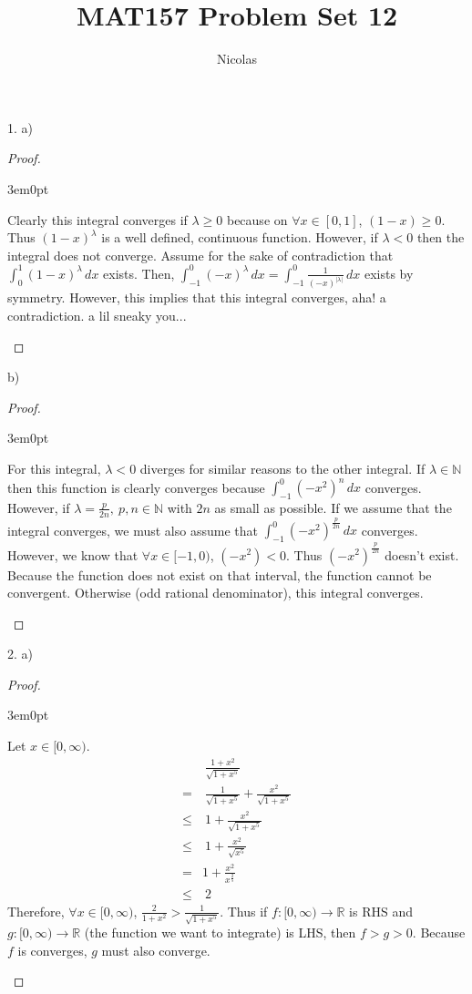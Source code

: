 \documentclass[11pt]{article}
\title{MAT157 Problem Set 12}
\author{Nicolas}
\newcommand{\R}{\mathbb{R}}
\newcommand{\N}{\mathbb{N}}
\newenvironment{myproof}
{\begin{proof} \begin{adjustwidth}{3em}{0pt}$ $\par\nobreak\ignorespaces}
{\end{adjustwidth} \end{proof}}
\begin{document}
\maketitle
\begin{flushleft}

1. a)

\begin{myproof}
Clearly this integral converges if $\lambda \geq 0$ because on $\forall x \in [0,1]$, $(1-x) \geq 0$. Thus $(1-x)^\lambda$ is a well defined, continuous function. However, if $\lambda < 0$ then the integral does not converge. Assume for the sake of contradiction that $\int_0^1 (1-x)^\lambda \,dx$ exists. Then, $\int_{-1}^0(-x)^\lambda \,dx = \int_{-1}^0\frac{1}{(-x)^{|\lambda|}} \,dx$ exists by symmetry. However, this implies that this integral converges, aha! a contradiction. a lil sneaky you...
\end{myproof}

b)

\begin{myproof}
For this integral, $\lambda < 0$ diverges for similar reasons to the other integral. If $\lambda \in \N$ then this function is clearly converges because $\int_{-1}^0(-x^2)^n \,dx$ converges. However, if $\lambda = \frac{p}{2n}, \ p,n \in \N$ with $2n$ as small as possible. If we assume that the integral converges, we must also assume that $\int_{-1}^0(-x^2)^{\frac{p}{2n}} \,dx$ converges. However, we know that $\forall x \in [-1,0)$, $(-x^2) < 0$. Thus $(-x^2)^{\frac{p}{2n}}$ doesn't exist. Because the function does not exist on that interval, the function cannot be convergent. Otherwise (odd rational denominator), this integral converges.
\end{myproof}

\newpage

2. a)

\begin{myproof}
Let $x \in [0, \infty)$.
\begin{align*}
& \ \frac{1+x^2}{\sqrt{1+x^5}} \\
 = & \ \frac{1}{\sqrt{1+x^5}} + \frac{x^2}{\sqrt{1+x^5}} \\
 \leq & \ 1 + \frac{x^2}{\sqrt{1+x^5}} \\
 \leq & \ 1 + \frac{x^2}{\sqrt{x^5}} \\
 = & 1 + \frac{x^2}{x^\frac{2}{5}} \\
 \leq & \ 2
\end{align*}
Therefore, $\forall x \in [0, \infty)$, $\frac{2}{1+x^2} > \frac{1}{\sqrt{1+x^5}}$. Thus if $f:[0, \infty) \to \R$ is RHS and $g:[0, \infty) \to \R$ (the function we want to integrate) is LHS, then $f > g > 0$. Because $f$ is converges, $g$ must also converge.
\end{myproof}


\end{flushleft}
\end{document}
